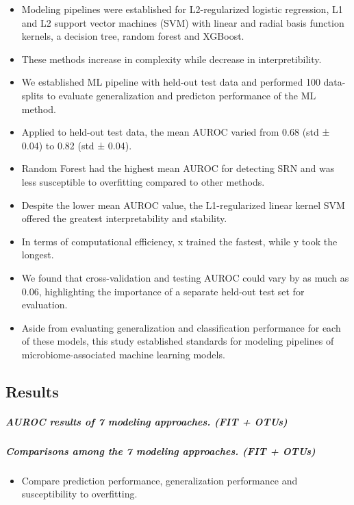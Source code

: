 \documentclass[11pt,]{article}
\providecommand{\tightlist}{%
  \setlength{\itemsep}{0pt}\setlength{\parskip}{0pt}}
\let\oldsubparagraph\subparagraph
\renewcommand{\subparagraph}[1]{\oldsubparagraph{#1}\mbox{}}
\begin{document}
\begin{itemize}
\item
  Modeling pipelines were established for L2-regularized logistic
  regression, L1 and L2 support vector machines (SVM) with linear and
  radial basis function kernels, a decision tree, random forest and
  XGBoost.
\item
  These methods increase in complexity while decrease in
  interpretibility.
\item
  We established ML pipeline with held-out test data and performed 100
  data-splits to evaluate generalization and predicton performance of
  the ML method.
\item
  Applied to held-out test data, the mean AUROC varied from 0.68 (std ±
  0.04) to 0.82 (std ± 0.04).
\item
  Random Forest had the highest mean AUROC for detecting SRN and was
  less susceptible to overfitting compared to other methods.
\item
  Despite the lower mean AUROC value, the L1-regularized linear kernel
  SVM offered the greatest interpretability and stability.
\item
  In terms of computational efficiency, x trained the fastest, while y
  took the longest.
\item
  We found that cross-validation and testing AUROC could vary by as much
  as 0.06, highlighting the importance of a separate held-out test set
  for evaluation.
\item
  Aside from evaluating generalization and classification performance
  for each of these models, this study established standards for
  modeling pipelines of microbiome-associated machine learning models.
\end{itemize}

\subsection{Results}\label{results}

\subparagraph{AUROC results of 7 modeling approaches. (FIT +
OTUs)}\label{auroc-results-of-7-modeling-approaches.-fit-otus}

\subparagraph{Comparisons among the 7 modeling approaches. (FIT +
OTUs)}\label{comparisons-among-the-7-modeling-approaches.-fit-otus}

\begin{itemize}
\tightlist
\item
  Compare prediction performance, generalization performance and
  susceptibility to overfitting.
\end{itemize}
\end{document}
